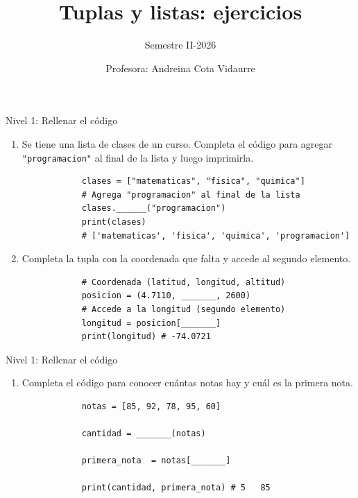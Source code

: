 \documentclass{beamer}
\title{Tuplas y listas: ejercicios} %
\subtitle{Semestre II-2026} %
\author{Profesora: Andreina Cota Vidaurre}
\begin{document}
  \shorthandoff{-}
  \frame[c]{\maketitle}


    \begin{frame}[fragile, t]{Nivel 1: Rellenar el código}
        \begin{enumerate}
            \item Se tiene una lista de clases de un curso. Completa el código para agregar 
            \texttt{"programacion"} al final de la lista y luego imprimirla.
            \begin{verbatim} 
            clases = ["matematicas", "fisica", "quimica"]
            # Agrega "programacion" al final de la lista
            clases.______("programacion")
            print(clases)
            # ['matematicas', 'fisica', 'quimica', 'programacion']
            \end{verbatim}
            \item Completa la tupla con la coordenada que falta y accede al segundo elemento.
            \begin{verbatim}
            # Coordenada (latitud, longitud, altitud)
            posicion = (4.7110, _______, 2600)
            # Accede a la longitud (segundo elemento)
            longitud = posicion[_______]
            print(longitud) # -74.0721
            \end{verbatim}
        \end{enumerate}
    \end{frame}

    \begin{frame}[fragile, t]{Nivel 1: Rellenar el código}
        \begin{enumerate}
            \item[3.] Completa el código para conocer cuántas notas hay y cuál es la primera nota.
            \begin{verbatim}
            notas = [85, 92, 78, 95, 60]
            
            cantidad = _______(notas)
            
            primera_nota  = notas[_______]
            
            print(cantidad, primera_nota) # 5   85
            \end{verbatim}
        \end{enumerate}
    \end{frame}
\end{document}
